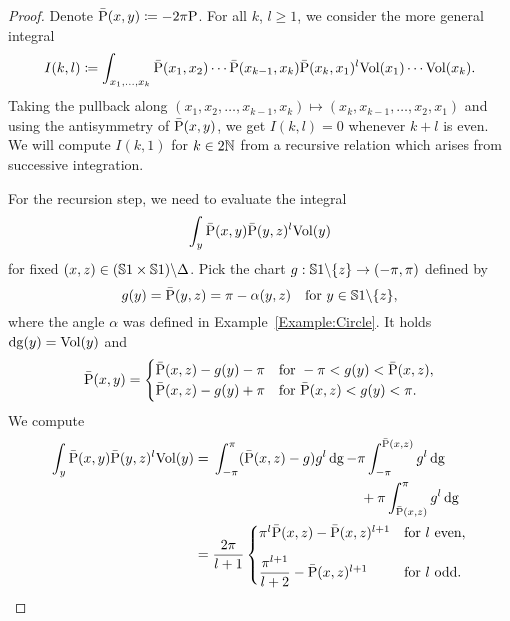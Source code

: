 \documentclass[\MainFolder/Text.tex]{subfiles}
\begin{document}
\begin{proof}
Denote $\bar{\mathrm{P}}(x,y) \coloneqq -2\pi \mathrm{P}$. For all $k$, $l \ge 1$, we consider the more general integral
$$ I(k,l) \coloneqq \int_{x_1, \dotsc, x_k} \bar{\mathrm{P}}(x_1,x_2) \dotsm \bar{\mathrm{P}}(x_{k-1},x_k) \bar{\mathrm{P}}(x_k,x_1)^l\mathrm{Vol}(x_1) \dotsm \mathrm{Vol}(x_k). $$
Taking the pullback along $(x_1, x_2, \dotsc, x_{k-1}, x_k) \mapsto (x_k, x_{k-1}, \dotsc, x_2, x_1)$ and using the antisymmetry of $\bar{\mathrm{P}}(x,y)$, we get $I(k,l) = 0$ whenever $k+l$ is even. We will compute $I(k,1)$ for $k\in 2\mathbb{N}$ from a recursive relation which arises from successive integration.

For the recursion step, we need to evaluate the integral 
$$\int_{y} \bar{\mathrm{P}}(x,y)\bar{\mathrm{P}}(y,z)^l \mathrm{Vol}(y)$$
for fixed $(x,z)\in (\mathbb{S}{1}\times \mathbb{S}{1})\backslash\Delta$. Pick the chart $g: \mathbb{S}{1}\backslash\{z\} \rightarrow (-\pi,\pi)$ defined by 
$$ g(y)= \bar{\mathrm{P}}(y,z) =  \pi - \alpha(y,z) \quad\text{for } y\in \mathbb{S}{1}\backslash\{z\}, $$
where the angle $\alpha$ was defined in Example~\ref{Example:Circle}. It holds $\operatorname{dg}(y) = \mathrm{Vol}(y)$ and
$$ \bar{\mathrm{P}}(x,y) = \begin{cases} \bar{\mathrm{P}}(x,z) - g(y) - \pi & \text{for }-\pi< g(y)< \bar{\mathrm{P}}(x,z), \\
\bar{\mathrm{P}}(x,z) - g(y) + \pi & \text{for }\bar{\mathrm{P}}(x,z)<g(y)<\pi.
 \end{cases}$$
We compute
\allowdisplaybreaks
\begin{align*}
\int_{y} \bar{\Prpg}(x,y)\bar{\Prpg}(y,z)^l \Vol(y) &= \begin{multlined}[t] \int_{-\pi}^{\pi} (\bar{\Prpg}(x,z) - g)g^l \Diff{g} - \pi \int_{-\pi}^{\bar{\Prpg}(x,z)} g^l \Diff{g} \\ {}+ \pi \int_{\bar{\Prpg}(x,z)}^\pi g^l \Diff{g} \end{multlined} \\
 &=  \frac{2\pi}{l+1} \begin{cases}
  \pi^l \bar{\Prpg}(x,z) - \bar{\Prpg}(x,z)^{l+1} & \text{for }l\text{ even},\\[2ex]
  \dfrac{\pi^{l+1}}{l+2} - \bar{\Prpg}(x,z)^{l+1} & \text{for }l \text{ odd}.
 \end{cases}
\end{align*}



\end{proof}
\end{document}
